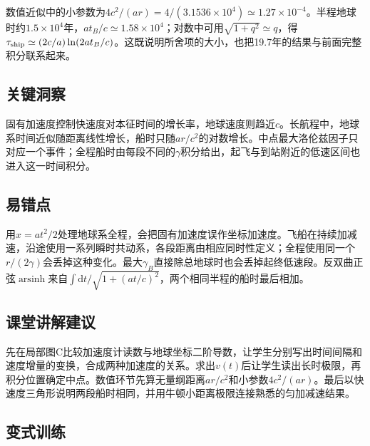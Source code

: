 \documentclass[UTF8,fontset=fandol,a4paper,11pt]{ctexart}
\begin{document}
数值近似中的小参数为$4c^2/(ar)=4/(3.1536\times10^4)\simeq1.27\times10^{-4}$。半程地球时约$1.5\times10^4$年，$at_B/c\simeq1.58\times10^4$；对数中可用$\sqrt{1+q^2}\simeq q$，得$\tau_{\rm ship}\simeq(2c/a)\ln(2at_B/c)$。这既说明所舍项的大小，也把19.7年的结果与前面完整积分联系起来。





\subsection*{关键洞察}

固有加速度控制快速度对本征时间的增长率，地球速度则趋近$c$。长航程中，地球系时间近似随距离线性增长，船时只随$ar/c^2$的对数增长。中点最大洛伦兹因子只对应一个事件；全程船时由每段不同的$\gamma$积分给出，起飞与到站附近的低速区间也进入这一时间积分。



\subsection*{易错点}

用$x=at^2/2$处理地球系全程，会把固有加速度误作坐标加速度。飞船在持续加减速，沿途使用一系列瞬时共动系，各段距离由相应同时性定义；全程使用同一个$r/(2\gamma)$会丢掉这种变化。最大$\gamma_B$直接除总地球时也会丢掉起终低速段。反双曲正弦$\operatorname{arsinh}$来自$\int\mathrm dt/\sqrt{1+(at/c)^2}$，两个相同半程的船时最后相加。



\subsection*{课堂讲解建议}

先在局部图C比较加速度计读数与地球坐标二阶导数，让学生分别写出时间间隔和速度增量的变换，合成两种加速度的关系。求出$v(t)$后让学生读出长时极限，再积分位置确定中点。数值环节先算无量纲距离$ar/c^2$和小参数$4c^2/(ar)$。最后以快速度三角形说明两段船时相同，并用牛顿小距离极限连接熟悉的匀加减速结果。



\subsection*{变式训练}
\end{document}
